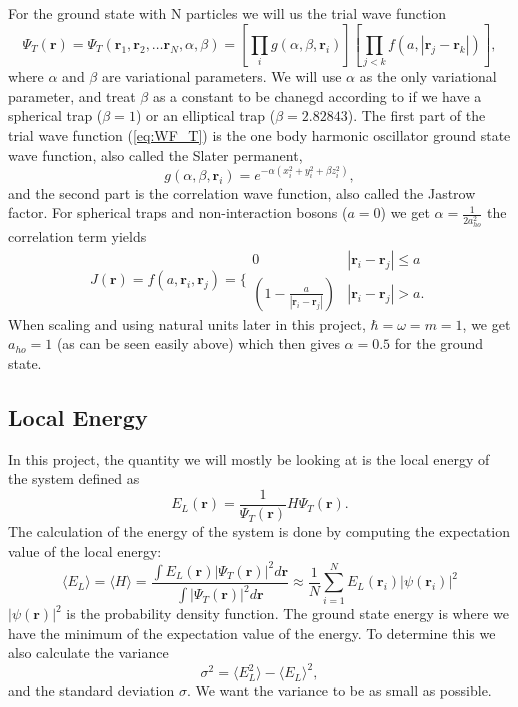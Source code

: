 \documentclass[12pt,a4paper,english]{article}
\begin{document}
For the ground state with N particles we will us the trial wave function
\begin{equation}
\label{eq:WF_T}
 \Psi_T(\mathbf{r})=\Psi_T(\mathbf{r}_1, \mathbf{r}_2, \dots \mathbf{r}_N,\alpha,\beta)
=\left[
\prod_i g(\alpha,\beta,\mathbf{r}_i)
\right]
\left[
\prod_{j<k}f(a,|\mathbf{r}_j-\mathbf{r}_k|)
\right], 
\end{equation}
where $\alpha$ and $\beta$ are variational parameters. We will use $\alpha$ as the only variational parameter, and treat $\beta$ as a constant to be chanegd according to if we have a spherical trap ($\beta=1$) or an elliptical trap ($\beta=2.82843$). The first part of the trial wave function (\ref{eq:WF_T}) is the one body harmonic oscillator ground state wave function, also called the Slater permanent,
\begin{equation}
\label{eq:g}
g(\alpha,\beta,\mathbf{r}_i)= e^{-\alpha(x_i^2+y_i^2+\beta z_i^2)},
\end{equation} 
and the second part is the correlation wave function, also called the Jastrow factor. For spherical traps and non-interaction bosons ($a=0$) we get $\alpha=\frac{1}{2a_{ho}^2}$ the correlation term yields
\begin{equation}
\label{eq:Jastrow}
J(\textbf{r})=f(a,\mathbf{r}_i,\mathbf{r}_j)=\Bigg\{
\begin{array}{ll}
0 & {|\mathbf{r}_i-\mathbf{r}_j|} \leq {a}\\
(1-\frac{a}{|\mathbf{r}_i-\mathbf{r}_j|}) & {|\mathbf{r}_i-\mathbf{r}_j|} > {a}.
\end{array}
\end{equation}
When scaling and using natural units later in this project, $\hbar=\omega=m=1$, we get $a_{ho}=1$ (as can be seen easily above) which then gives $\alpha=0.5$ for the ground state.

\subsection{Local Energy}
\label{subsect:Energy}
In this project, the quantity we will mostly be looking at is the local energy of the system defined as
\begin{equation}
\label{eq:local_energy}
E_L(\mathbf{r})=\frac{1}{\Psi_T(\mathbf{r})}H\Psi_T(\mathbf{r}).
\end{equation}  
The calculation of the energy of the system is done by computing the expectation value of the local energy:
\begin{equation}
\label{eq:expec_E}
\langle E_L\rangle=\langle H\rangle=\frac{\int E_L(\textbf{r})|\Psi_T(\textbf{r})|^2d\textbf{r}}{\int|\Psi_T(\textbf{r})|^2d\textbf{r}}\approx\frac{1}{N}\sum_{i=1}^{N}E_L(\textbf{r}_i)|\psi(\textbf{r}_i)|^2
\end{equation} 
$|\psi(\textbf{r})|^2$ is the probability density function. The ground state energy is where we have the minimum of the expectation value of the energy. To determine this we also calculate the variance 
\begin{equation}
\label{eq:variance}
\sigma^2=\langle E_L^2\rangle-\langle E_L\rangle^2,
\end{equation}
and the standard deviation $\sigma$. We want the variance to be as small as possible.
\end{document}
